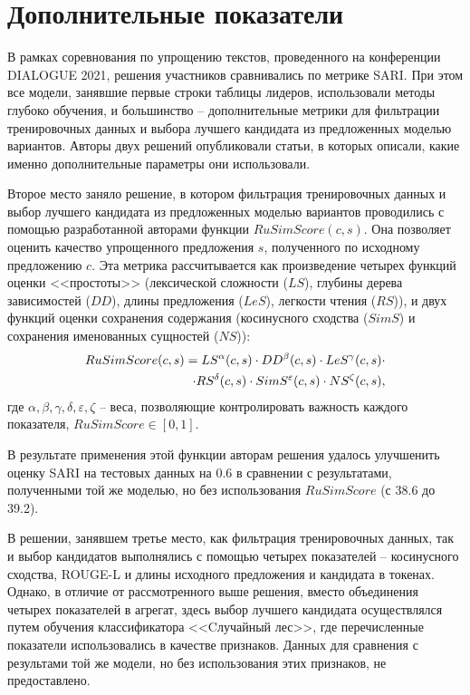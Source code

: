 \section{Дополнительные показатели}

В рамках соревнования по упрощению текстов, проведенного на конференции DIALOGUE 2021, решения участников сравнивались по метрике SARI. При этом все модели, занявшие первые строки таблицы лидеров, использовали методы глубоко обучения, и большинство -- дополнительные метрики для фильтрации тренировочных данных и выбора лучшего кандидата из предложенных моделью вариантов. Авторы двух решений опубликовали статьи, в которых описали, какие именно дополнительные параметры они использовали.

Второе место заняло решение\cite{saint_petersburg_russia_rusimscore_2021}, в котором фильтрация тренировочных данных и выбор лучшего кандидата из предложенных моделью вариантов проводились с помощью разработанной авторами функции $RuSimScore(c, s)$. Она позволяет оценить качество упрощенного предложения $s$, полученного по исходному предложению $c$. Эта метрика рассчитывается как произведение четырех функций оценки <<простоты>> (лексической сложности ($LS$), глубины дерева зависимостей ($DD$), длины предложения ($LeS$), легкости чтения ($RS$)), и двух функций оценки сохранения содержания (косинусного сходства ($SimS$) и сохранения именованных сущностей ($NS$)):
\begin{eqnarray} 
	\label{eq:20}
	RuSimScore(c, s) = LS^{\alpha}(c, s) \cdot DD^{\beta}(c, s) \cdot LeS^{\gamma}(c, s) \cdot \notag \\ \cdot  RS^{\delta}(c, s) \cdot SimS^{\varepsilon}(c, s) \cdot NS^{\zeta}(c, s) ,
\end{eqnarray}
где $\alpha, \beta, \gamma, \delta, \varepsilon, \zeta$ -- веса, позволяющие контролировать важность каждого показателя, $RuSimScore\in{\left[0, 1\right]}$.

В результате применения этой функции авторам решения удалось улучшенить оценку SARI на тестовых данных на 0.6 в сравнении с результатами, полученными той же моделью, но без использования $RuSimScore$ (с 38.6 до 39.2).


В решении\cite{ranepa_moscow_russia_sentence_2021}, занявшем третье место, как фильтрация тренировочных данных, так и выбор кандидатов выполнялись с помощью четырех показателей -- косинусного сходства, ROUGE-L и длины исходного предложения и кандидата в токенах. Однако, в отличие от рассмотренного выше решения, вместо объединения четырех показателей в агрегат, здесь выбор лучшего кандидата осуществлялся путем обучения классификатора <<Cлучайный лес>>, где перечисленные показатели использовались в качестве признаков. Данных для сравнения с результами той же модели, но без использования этих признаков, не предоставлено.

